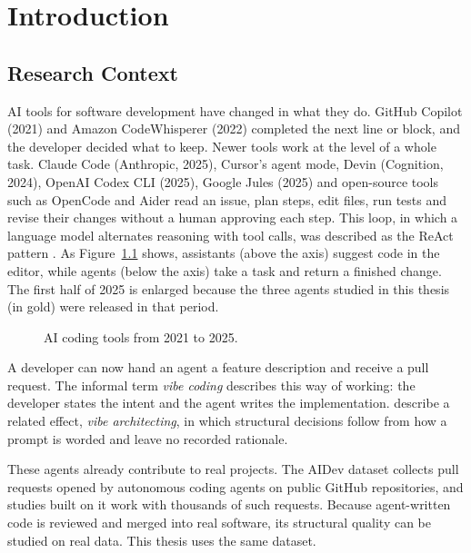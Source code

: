 \chapter{Introduction}
\label{ch:introduction}
\newpage

\section{Research Context}
\label{sec:research-context}

AI tools for software development have changed in what they do. GitHub Copilot (2021) and Amazon
CodeWhisperer (2022) completed the next line or block, and the developer decided what to keep.
Newer tools work at the level of a whole task. Claude Code (Anthropic, 2025), Cursor's agent mode,
Devin (Cognition, 2024), OpenAI Codex CLI (2025), Google Jules (2025) and open-source tools such as
OpenCode and Aider read an issue, plan steps, edit files, run tests and revise their changes without
a human approving each step. This loop, in which a language model alternates reasoning with tool
calls, was described as the ReAct pattern \citep{yao2023react}. As Figure~\ref{fig:timeline} shows,
assistants (above the axis) suggest code in the editor, while agents (below the axis) take a task and
return a finished change. The first half of 2025 is enlarged because the three agents studied in this
thesis (in gold) were released in that period.

\begin{figure}[htb]
\centering

\caption{AI coding tools from 2021 to 2025.}
\label{fig:timeline}
\end{figure}

A developer can now hand an agent a feature description and receive a pull request. The informal
term \emph{vibe coding} describes this way of working: the developer states the intent and the agent
writes the implementation. \citet{konrad2026vibe} describe a related effect, \emph{vibe
architecting}, in which structural decisions follow from how a prompt is worded and leave no
recorded rationale.

These agents already contribute to real projects. The AIDev dataset \citep{li2025aidev} collects
pull requests opened by autonomous coding agents on public GitHub repositories, and studies built
on it work with thousands of such requests. Because agent-written code is reviewed and merged into
real software, its structural quality can be studied on real data. This thesis uses the same
dataset.

